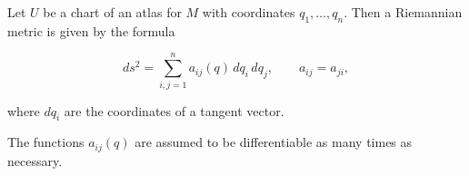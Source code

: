 Let $U$ be a chart of an atlas for $M$ with coordinates $q_1, \ldots, q_n$. Then a Riemannian metric is given by the formula

$$ds^2 = \sum_{i,j=1}^{n} a_{ij}(q)\, dq_i\, dq_j, \qquad a_{ij} = a_{ji},$$

where $dq_i$ are the coordinates of a tangent vector.

The functions $a_{ij}(q)$ are assumed to be differentiable as many times as necessary.
